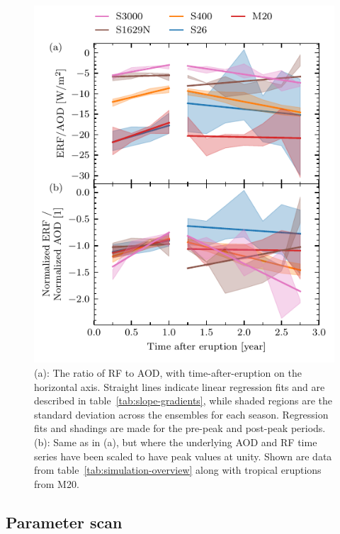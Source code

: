 \documentclass[draft]{agujournal2019}
\begin{document}
  \begin{figure}
    \centering \includegraphics{figure3}

    \caption{(a): The ratio of RF to AOD, with time-after-eruption on the horizontal
      axis. Straight lines indicate linear regression fits and are described in
      table~\ref{tab:slope-gradients}, while shaded regions are the standard deviation
      across the ensembles for each season. Regression fits and shadings are made for
      the pre-peak and post-peak periods. (b): Same as in (a), but where the underlying
      AOD and RF time series have been scaled to have peak values at unity. Shown are
      data from table~\ref{tab:simulation-overview} along with tropical eruptions from
      M20.}\label{fig:3_rf_to_aod_ratios}%
  \end{figure}

  \subsection{Parameter scan}
\end{document}
